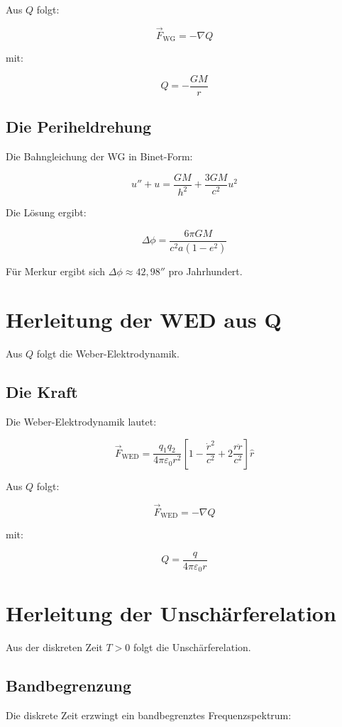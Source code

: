 Aus \( Q \) folgt:

\[
\vec{F}_{\text{WG}} = -\nabla Q
\]

mit:

\[
Q = -\frac{GM}{r}
\]

\subsection{Die Periheldrehung}

Die Bahngleichung der WG in Binet-Form:

\[
u'' + u = \frac{GM}{h^2} + \frac{3GM}{c^2} u^2
\]

Die Lösung ergibt:

\[
\Delta \phi = \frac{6\pi GM}{c^2 a (1 - e^2)}
\]

Für Merkur ergibt sich \( \Delta \phi \approx 42,98'' \) pro Jahrhundert.

\section{Herleitung der WED aus Q}

Aus \( Q \) folgt die Weber-Elektrodynamik.

\subsection{Die Kraft}

Die Weber-Elektrodynamik lautet:

\[
\vec{F}_{\text{WED}} = \frac{q_1 q_2}{4\pi \varepsilon_0 r^2} \left[ 1 - \frac{\dot{r}^2}{c^2} + 2 \frac{r\ddot{r}}{c^2} \right] \hat{r}
\]

Aus \( Q \) folgt:

\[
\vec{F}_{\text{WED}} = -\nabla Q
\]

mit:

\[
Q = \frac{q}{4\pi \varepsilon_0 r}
\]

\section{Herleitung der Unschärferelation}

Aus der diskreten Zeit \( T > 0 \) folgt die Unschärferelation.

\subsection{Bandbegrenzung}

Die diskrete Zeit erzwingt ein bandbegrenztes Frequenzspektrum:

